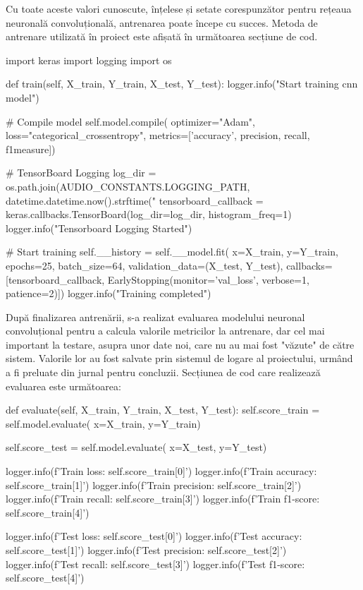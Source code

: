 \documentclass[a4paper,12pt]{report}
\begin{document}
Cu toate aceste valori cunoscute, înțelese și setate corespunzător pentru rețeaua 
neuronală convoluțională, antrenarea poate începe cu succes. Metoda de antrenare 
utilizată în proiect este afișată în următoarea secțiune de cod.

\begin{python}
    import keras
    import logging
    import os

    def train(self, X_train, Y_train, X_test, Y_test):
        logger.info("Start training cnn model")

        # Compile model
        self.model.compile(
            optimizer="Adam",
            loss="categorical_crossentropy",
            metrics=['accuracy', precision, recall, f1measure])

        # TensorBoard Logging
        log_dir = os.path.join(AUDIO_CONSTANTS.LOGGING_PATH, datetime.datetime.now().strftime("%
        tensorboard_callback = keras.callbacks.TensorBoard(log_dir=log_dir, histogram_freq=1)
        logger.info("Tensorboard Logging Started")
        
        # Start training
        self.__history = self.__model.fit(
            x=X_train,
            y=Y_train,
            epochs=25,
            batch_size=64,
            validation_data=(X_test, Y_test),
            callbacks=[tensorboard_callback,
                       EarlyStopping(monitor='val_loss', 
                       verbose=1, patience=2)])
        logger.info("Training completed")
\end{python}

După finalizarea antrenării, s-a realizat evaluarea modelului neuronal convoluțional 
pentru a calcula valorile metricilor la antrenare, dar cel mai important la testare, 
asupra unor date noi, care nu au mai fost "văzute" de către sistem. 
Valorile lor au fost salvate prin sistemul de logare al proiectului, urmând 
a fi preluate din jurnal pentru concluzii. Secțiunea de cod 
care realizează evaluarea este următoarea:

\begin{python}
    def evaluate(self, X_train, Y_train, X_test, Y_test):
        self.score_train = self.model.evaluate(
            x=X_train,
            y=Y_train)

        self.score_test = self.model.evaluate(
            x=X_test,
            y=Y_test)

        logger.info(f'Train loss: {self.score_train[0]}')
        logger.info(f'Train accuracy: {self.score_train[1]}')
        logger.info(f'Train precision: {self.score_train[2]}')
        logger.info(f'Train recall: {self.score_train[3]}')
        logger.info(f'Train f1-score: {self.score_train[4]}')

        logger.info(f'Test loss: {self.score_test[0]}')
        logger.info(f'Test accuracy: {self.score_test[1]}')
        logger.info(f'Test precision: {self.score_test[2]}')
        logger.info(f'Test recall: {self.score_test[3]}')
        logger.info(f'Test f1-score: {self.score_test[4]}')
\end{python}
\end{document}
